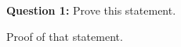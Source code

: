 \documentclass{article}
\theoremstyle{plain}
\theoremstyle{definition}
\theoremstyle{remark}
\newenvironment{inline_proof}{\textit{Proof:}}{\hfill$\blacksquare$ \\}
\newenvironment{question}[1]{\begin{tcolorbox}\textbf{Question #1: }}{\end{tcolorbox}}
\begin{document}

\newpage
\setcounter{equation}{0}
\setcounter{thm}{0}
\begin{question}{1}
  Prove this statement.
\end{question}
\begin{inline_proof}
  Proof of that statement.
\end{inline_proof}



\end{document}
